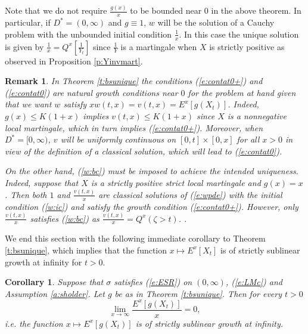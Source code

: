 \documentclass[11pt,reqno]{amsart}
\numberwithin{equation}{section}
\newtheorem{corollary}{Corollary}[section]
\newtheorem{remark}{Remark}[section]
\def\rar{\rightarrow}
\begin{document}
 Note that we do not require $\frac{g(x)}{x}$ to be bounded near $0$ in the above theorem. In particular, if $D^*=(0,\infty)$ and $g\equiv 1$, $w$ will be the solution of a Cauchy problem with the unbounded initial condition $\frac{1}{x}$. In this case the unique solution is given by $\frac{1}{x}=Q^x[\frac{1}{Y_t}]$ since $\frac{1}{Y}$ is a martingale when $X$ is strictly positive as observed in Proposition  \ref{p:Yinvmart}.
\begin{remark} In Theorem \ref{t:bsunique} the conditions (\ref{e:contat0+}) and (\ref{e:contat0})  are natural growth conditions near $0$ for the problem at hand given that we want $w$ satisfy $xw(t,x)=v(t,x)=E^x[g(X_t)]$. Indeed, $g(x) \leq K(1+x)$ implies $v(t,x)\leq K(1+x)$ since $X$ is a nonnegative local martingale, which in turn implies (\ref{e:contat0+}). Moreover, when $D^*=[0,\infty)$, $v$ will be uniformly continuous on $[0,t]\times[0,x]$ for all $x>0$ in view of the definition of a classical solution, which will lead to (\ref{e:contat0}).
	
  On the other hand, (\ref{w:bc}) must be imposed to achieve the intended uniqueness. Indeed, suppose that $X$ is a strictly positive strict local martingale and $g(x)=x$. Then both $1$ and $\frac{v(t,x)}{x}$ are classical solutions of (\ref{e:wpde}) with the initial condition (\ref{w:ic}) and satisfy the growth condition  (\ref{e:contat0+}). However, only $\frac{v(t,x)}{x}$ satisfies (\ref{w:bc}) as $\frac{v(t,x)}{x}=Q^x(\zeta>t)$. . 
\end{remark}
We end this section with the following immediate corollary to Theorem \ref{t:bsunique}, which implies that the function $x \mapsto E^x[X_t]$ is of strictly sublinear growth at infinity for  $t>0$.
\begin{corollary}
Suppose that $\sigma$ satisfies (\ref{e:ESR}) on $(0,\infty)$, (\ref{e:LMc}) and Assumption \ref{a:sholder}. Let $g$ be as in Theorem \ref{t:bsunique}. Then for every $t>0$
\[
\lim_{x \rar \infty}\frac{E^x[g(X_t)]}{x}=0,
\]
i.e. the function $x \mapsto E^x[g(X_t)]$ is of strictly sublinear growth at infinity. 
\end{corollary}
\end{document}
